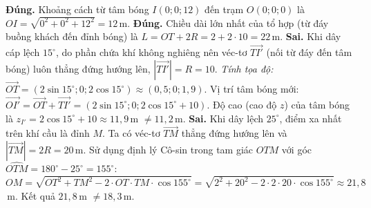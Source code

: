 \begin{ex}
{		\begin{itemchoice}
			\itemch \textbf{Đúng.} Khoảng cách từ tâm bóng $I(0;0;12)$ đến trạm $O(0;0;0)$ là $OI = \sqrt{0^2+0^2+12^2} = 12$\,m.
			\itemch \textbf{Đúng.} Chiều dài lớn nhất của tổ hợp (từ đáy buồng khách đến đỉnh bóng) là $L = OT + 2R = 2 + 2 \cdot 10 = 22$\,m.
			\itemch \textbf{Sai.} Khi dây cáp lệch $15^\circ$, do phần chứa khí không nghiêng nên véc-tơ $\overrightarrow{TI'}$ (nối từ đáy đến tâm bóng) luôn thẳng đứng hướng lên, $|\overrightarrow{TI'}| = R = 10$.
			\textit{Tính tọa độ:} $\overrightarrow{OT} = (2\sin 15^\circ; 0; 2\cos 15^\circ) \approx (0,5; 0; 1,9)$.
			Vị trí tâm bóng mới: $\overrightarrow{OI'} = \overrightarrow{OT} + \overrightarrow{TI'} = (2\sin 15^\circ; 0; 2\cos 15^\circ + 10)$.
			Độ cao (cao độ $z$) của tâm bóng là $z_{I'} = 2\cos 15^\circ + 10 \approx 11{,}9$\,m $\neq 11{,}2$\,m. 
			\itemch \textbf{Sai.} Khi dây lệch $25^\circ$, điểm xa nhất trên khí cầu là đỉnh $M$.
			Ta có véc-tơ $\overrightarrow{TM}$ thẳng đứng hướng lên và $|\overrightarrow{TM}| = 2R = 20$\,m.
			Sử dụng định lý Cô-sin trong tam giác $OTM$ với góc $\widehat{OTM} = 180^\circ - 25^\circ = 155^\circ$:
			$OM = \sqrt{OT^2 + TM^2 - 2\cdot OT \cdot TM \cdot \cos 155^\circ} = \sqrt{2^2 + 20^2 - 2\cdot 2 \cdot 20 \cdot \cos 155^\circ} \approx 21{,}8$\,m.
			Kết quả $21{,}8$\,m $\neq 18{,}3$\,m. 
		\end{itemchoice}
	}
\end{ex}


